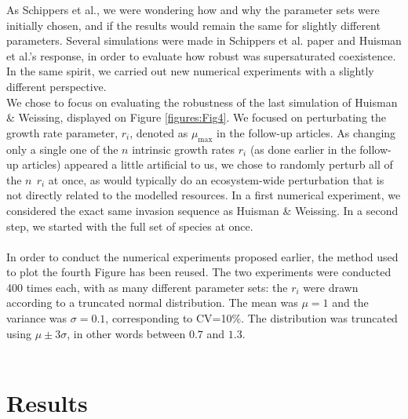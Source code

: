 As Schippers et al.\supercite{2008:Schippers}, we were wondering how and why the parameter sets were initially chosen, 
and if the results would remain the same for slightly different parameters. Several simulations were made in 
Schippers et al. paper\supercite{2008:Schippers} and Huisman et al.'s response\supercite{2008:Huisman}, in order to evaluate how robust was supersaturated 
coexistence. In the same spirit, we carried out new numerical experiments with a slightly different perspective.\\

We chose to focus on evaluating the robustness of the last simulation of Huisman \& Weissing\supercite{1999:Huisman}, displayed on Figure \ref{figures:Fig4}. We focused on perturbating the growth rate parameter, $r_i$, denoted as $\mu_{\text{max}}$ in the follow-up articles\supercite{2008:Schippers,2008:Huisman}. 
As changing only a single one of the $n$ intrinsic growth rates $r_i$ (as done earlier in the follow-up articles\supercite{2008:Schippers,2008:Huisman}) appeared a little artificial to us, 
we chose to randomly perturb all of the $n~~r_i$ at once, as would typically do an ecosystem-wide perturbation that is not directly related to the modelled resources. 
In a first numerical experiment, we considered the exact same invasion sequence as Huisman \& Weissing\supercite{1999:Huisman}. 
In a second step, we started with the full set of species at once.\\
\\
In order to conduct the numerical experiments proposed earlier, the method used to plot the 
fourth Figure has been reused. The two experiments were conducted 400 times each, 
with as many different parameter sets: the $r_i$ were drawn according to a 
truncated normal distribution. The mean was $\mu=1$ and the variance was 
$\sigma=0.1$, corresponding to CV=10\%. The distribution was truncated using $\mu\pm3\sigma$, in other 
words between $0.7$ and $1.3$.\\~\\ 
\section{Results}
